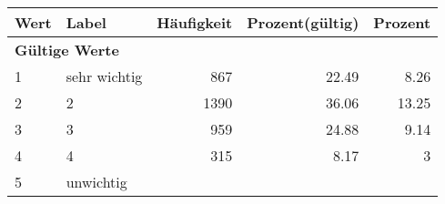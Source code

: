      \begin{longtable}{lXrrr}
     \toprule
     \textbf{Wert} & \textbf{Label} & \textbf{Häufigkeit} & \textbf{Prozent(gültig)} & \textbf{Prozent} \\
     \endhead
     \midrule
     \multicolumn{5}{l}{\textbf{Gültige Werte}}\\

     1 &
     \multicolumn{1}{X}{ sehr wichtig   } &


       \num{867} &
       \num[round-mode=places,round-precision=2]{22,49} &
         \num[round-mode=places,round-precision=2]{8,26} \\

     2 &
     \multicolumn{1}{X}{ 2   } &


       \num{1390} &
       \num[round-mode=places,round-precision=2]{36,06} &
         \num[round-mode=places,round-precision=2]{13,25} \\

     3 &
     \multicolumn{1}{X}{ 3   } &


       \num{959} &
       \num[round-mode=places,round-precision=2]{24,88} &
         \num[round-mode=places,round-precision=2]{9,14} \\

     4 &
     \multicolumn{1}{X}{ 4   } &


       \num{315} &
       \num[round-mode=places,round-precision=2]{8,17} &
         \num[round-mode=places,round-precision=2]{3} \\

     5 &
     \multicolumn{1}{X}{ unwichtig   } &



\end{longtable}
